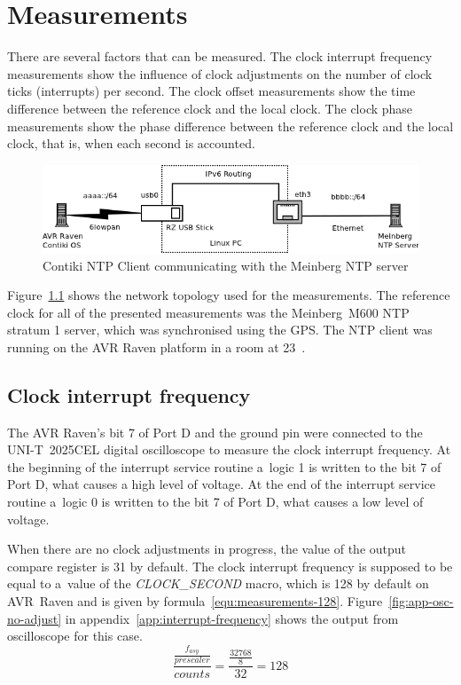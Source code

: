 
\chapter{Measurements}\label{chap:measurements}
There are several factors that can be measured.
The clock interrupt frequency measurements show the influence of clock adjustments
on the number of clock ticks (interrupts) per second.
The clock offset measurements show the time difference between the reference clock and
the local clock.
The clock phase measurements show the phase difference between the reference clock and
the local clock, that is, when each second is accounted.
\begin{figure}[H]
	\centering
	\includegraphics[width=13cm,keepaspectratio]{fig/radvd-routing.png}
	\caption{Contiki NTP Client communicating with the Meinberg NTP server}
	\label{fig:measurements-routing}
\end{figure}
Figure~\ref{fig:measurements-routing} shows the network topology used for the measurements.
The reference clock for all of the presented measurements was
the Meinberg~M600 NTP stratum 1 server, which was synchronised using the GPS.
The NTP client was running on the AVR Raven platform in a room at 23~\textcelsius.

\section{Clock interrupt frequency}
The AVR Raven's bit 7 of Port D and the ground pin were
connected to the UNI-T~2025CEL digital oscilloscope
to measure the clock interrupt frequency.
At the beginning of the interrupt service routine a~logic 1 is written
to the bit 7 of Port D, what causes a high level of voltage.
At the end of the interrupt service routine a~logic 0 is written
to the bit 7 of Port D, what causes a low level of voltage.

When there are no clock adjustments in progress, the value of the output compare register is 31 by default.
The clock interrupt frequency
is supposed to be equal to a~value of the {\it{CLOCK\_SECOND}} macro, which is 128 by default on AVR~Raven
and is given by formula~\ref{equ:measurements-128}.
Figure~\ref{fig:app-osc-no-adjust} in appendix~\ref{app:interrupt-frequency} shows the output from oscilloscope
for this case.
\begin{equation}
\label{equ:measurements-128}
\frac{\frac{f_{asy}}{prescaler}}{counts} = \frac{\frac{32768}{8}}{32} = 128
\end{equation}

